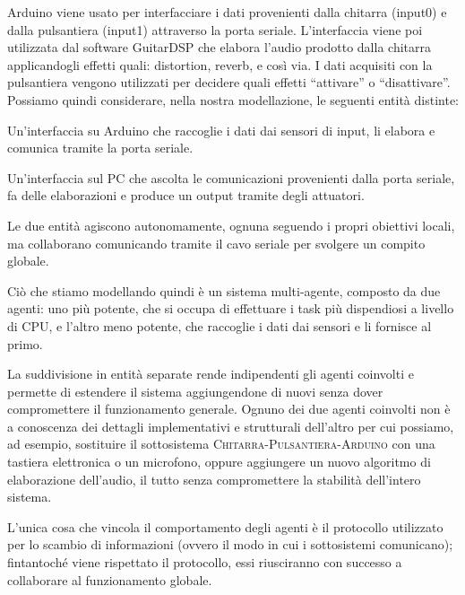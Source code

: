 \documentclass[a4paper,11pt]{article}
\begin{document}
Arduino viene usato per interfacciare i dati provenienti dalla chitarra (input0) e dalla pulsantiera (input1) attraverso la porta seriale. L'interfaccia viene poi utilizzata dal software GuitarDSP che elabora l'audio prodotto dalla chitarra applicandogli effetti quali: distortion, reverb, e così via. I dati acquisiti con la pulsantiera vengono utilizzati per decidere quali effetti ``attivare'' o ``disattivare''. Possiamo quindi considerare, nella nostra modellazione, le seguenti entità distinte:\begin{center}
    \begin{minipage}[t]{0.4\textwidth}
        \begin{tcolorbox}
        Un'interfaccia su Arduino che raccoglie i dati dai sensori di input, li elabora e comunica tramite la porta seriale.
        \end{tcolorbox}
    \end{minipage}
    \begin{minipage}[t]{0.5\textwidth}
        \begin{tcolorbox}
        Un'interfaccia sul PC che ascolta le comunicazioni provenienti dalla porta seriale, fa delle elaborazioni e produce un output tramite degli attuatori.
        \end{tcolorbox}
    \end{minipage}
\end{center}

Le due entità agiscono autonomamente, ognuna seguendo i propri obiettivi locali, ma collaborano comunicando tramite il cavo seriale per svolgere un compito globale.

Ciò che stiamo modellando quindi è un sistema multi-agente, composto da due agenti: uno più potente, che si occupa di effettuare i task più dispendiosi a livello di CPU, e l'altro meno potente, che raccoglie i dati dai sensori e li fornisce al primo.

La suddivisione in entità separate rende indipendenti gli agenti coinvolti e permette di estendere il sistema aggiungendone di nuovi senza dover compromettere il funzionamento generale. Ognuno dei due agenti coinvolti non è a conoscenza dei dettagli implementativi e strutturali dell'altro per cui possiamo, ad esempio, sostituire il sottosistema \textsc{Chitarra-Pulsantiera-Arduino} con una tastiera elettronica o un microfono, oppure aggiungere un nuovo algoritmo di elaborazione dell'audio, il tutto senza compromettere la stabilità dell'intero sistema.

L'unica cosa che vincola il comportamento degli agenti è il protocollo utilizzato per lo scambio di informazioni (ovvero il modo in cui i sottosistemi comunicano); fintantoché viene rispettato il protocollo, essi riusciranno con successo a collaborare al funzionamento globale.
\end{document}
